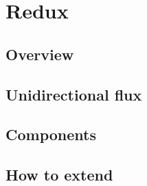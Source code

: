 \section{Redux} 
\subsection{Overview}
\subsection{Unidirectional flux} %
\subsection{Components} %
\subsection{How to extend} 